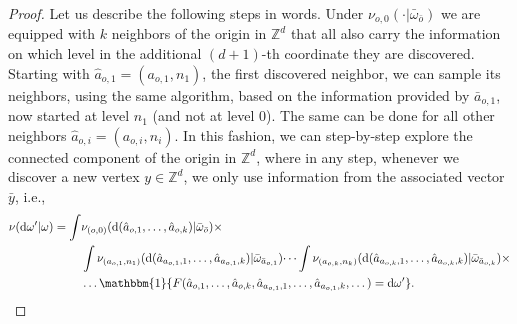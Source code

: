 \documentclass[oneside]{amsart}
\theoremstyle{definition}
\newcommand{\1}{\mathbbm{1}}
\newcommand{\0}{\mathbf{o}}
\renewcommand{\d}{\mathrm{d}}
\newcommand{\Z}{\mathbb{Z}}
\numberwithin{equation}{section}
\begin{document}
\begin{proof}
Let us describe the following steps in words. Under $\nu_{o,0}(\cdot|\bar\omega_{\bar o})$ we are equipped with $k$ neighbors of the origin in $\Z^d$ that all also carry the information on which level in the additional $(d+1)$-th coordinate they are discovered. Starting with $\hat a_{o,1}=(a_{o,1},n_1)$, the first discovered neighbor, we can sample its neighbors, using the same algorithm, based on the information provided by $\bar a_{o,1}$, now started at level $n_1$ (and not at level $0$). The same can be done for all other neighbors $\hat a_{o,i}=(a_{o,i},n_i)$. In this fashion, we can step-by-step explore the connected component of the origin in $\Z^d$, where in any step, whenever we discover a new vertex $y\in \Z^d$, we only use information from the associated vector $\bar y$, i.e., 
\begin{align*}
\nu(\d \omega'|\omega)=\int &\nu_{(o,0)}(\d(\hat a_{o,1},\dots,\hat a_{o,k})|\bar \omega_{\bar o})\times\\
&\int\nu_{(a_{o,1},n_1)}(\d(\hat a_{a_{o,1},1},\dots,\hat a_{a_{o,1},k})|\bar \omega_{\bar a_{o,1}})\dots \int\nu_{(a_{o,k},n_k)}(\d(\hat a_{a_{o,k},1},\dots,\hat a_{a_{o,k},k})|\bar \omega_{\bar a_{o,k}})\times\\
&\dots \1\{F(\hat a_{o,1},\dots,\hat a_{o,k},\hat a_{a_{o,1},1},\dots,\hat a_{a_{o,1},k},\dots)=\d \omega'\}.
\end{align*}


\end{proof}
\end{document}
